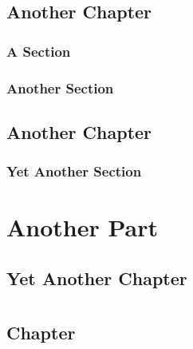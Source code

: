 \chapter{Another Chapter}
\lipsum[1] %
\lipsum[1] %

\section{A Section}
\lipsum[1] %

\section{Another Section}
\lipsum[1] %

\chapter{Another Chapter}
\lipsum[1] %

\section{Yet Another Section}
\lipsum[1] %

\part{Another Part}

\chapter{Yet Another Chapter}
\lipsum[1] %

\part{}
\chapter{ Chapter}
\lipsum[1]
